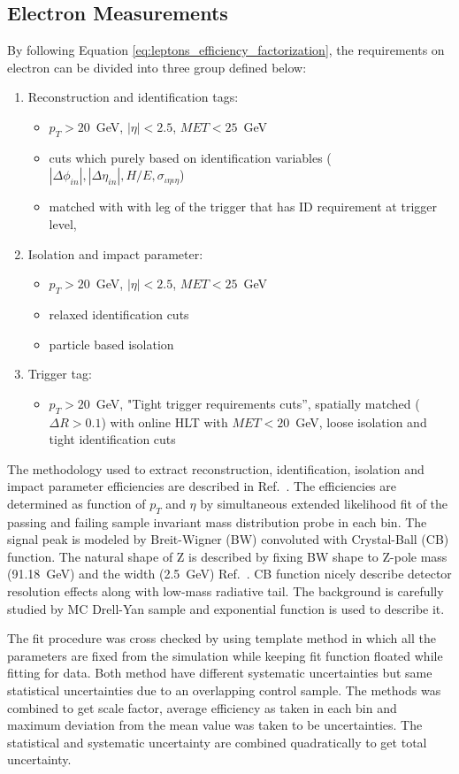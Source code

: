 \subsection{Electron Measurements}
By following Equation \ref{eq:leptons_efficiency_factorization}, the requirements on electron can be divided into three group defined below:
\begin{enumerate}
 \item Reconstruction and identification tags:
 \begin{itemize}
  \item $p_T > 20$~GeV, $|\eta| < 2.5$, $MET < 25$~GeV 
  \item cuts which purely based on identification variables ($|\Delta \phi_{in}|, |\Delta \eta_{in}|, H/E, \sigma_{\iota\eta\iota\eta}$) 
  \item matched with with leg of the trigger that has ID requirement at trigger level,
 \end{itemize}
 \item Isolation and impact parameter: 
  \begin{itemize}
   \item $p_T > 20$~GeV, $|\eta| < 2.5$, $MET < 25$~GeV
   \item relaxed identification cuts 
   \item particle based isolation
  \end{itemize}
  \item Trigger tag:
  \begin{itemize}
   \item $p_T > 20$~GeV, "Tight trigger requirements cuts'', spatially matched ($\Delta R > 0.1$) with online HLT with $MET < 20$~GeV, loose isolation 
   and tight identification cuts
  \end{itemize}
 
\end{enumerate}
\par The methodology used to extract reconstruction, identification, isolation and impact parameter efficiencies are described in Ref.~\cite{electron_eff_method}. 
The efficiencies are
 determined as function of $p_T$ and $\eta$ by simultaneous extended likelihood fit of the passing and failing  sample invariant mass distribution 
 probe in each bin. The signal peak is modeled by Breit-Wigner (BW) convoluted with Crystal-Ball (CB) function. The natural shape of Z is described 
 by fixing BW shape to Z-pole mass (91.18~GeV) and the width (2.5~GeV) Ref.~\cite{PDG_14}. CB function  nicely describe detector resolution effects along with 
 low-mass
 radiative tail. The background is carefully studied by MC Drell-Yan sample and exponential function is used to describe it.
 \par The fit procedure was cross checked by using template method in which all the parameters are fixed from the simulation while keeping fit function
 floated while fitting for data. Both method have different systematic uncertainties but same statistical uncertainties due to an overlapping control sample.
 The methods was combined to get scale factor, average efficiency as taken in each bin and maximum deviation from the mean value was taken to be uncertainties. 
 The statistical and systematic uncertainty are combined quadratically to get total uncertainty.
